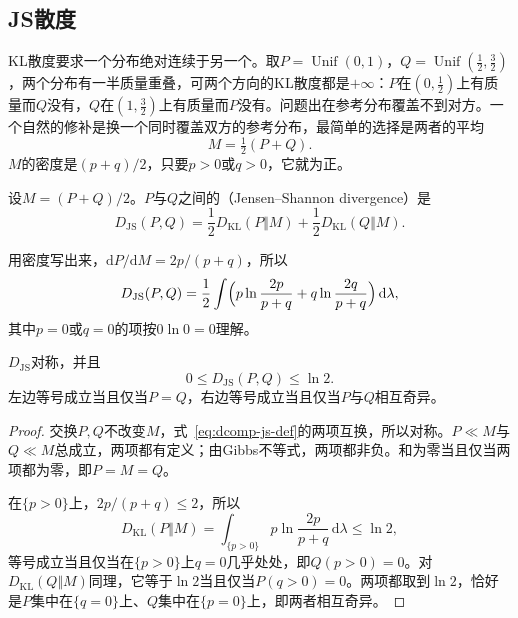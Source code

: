\subsection{JS散度}
\label{sec:dcomp-js}

KL散度要求一个分布绝对连续于另一个。取$P=\operatorname{Unif}(0,1)$，$Q=\operatorname{Unif}(\tfrac12,\tfrac32)$，两个分布有一半质量重叠，可两个方向的KL散度都是$+\infty$：$P$在$(0,\tfrac12)$上有质量而$Q$没有，$Q$在$(1,\tfrac32)$上有质量而$P$没有。问题出在参考分布覆盖不到对方。一个自然的修补是换一个同时覆盖双方的参考分布，最简单的选择是两者的平均
\[
 M=\tfrac12(P+Q) .
\]
$M$的密度是$(p+q)/2$，只要$p>0$或$q>0$，它就为正。

\begin{definition}[JS散度]
\label{def:dcomp-js}
设$M=(P+Q)/2$。$P$与$Q$之间的（Jensen--Shannon divergence）是
\begin{equation}
 D_{\mathrm{JS}}(P,Q)=\frac12D_{\mathrm{KL}}(P\Vert M)+\frac12D_{\mathrm{KL}}(Q\Vert M) .
 \label{eq:dcomp-js-def}
\end{equation}
\end{definition}

用密度写出来，$\mathrm{d}P/\mathrm{d}M=2p/(p+q)$，所以
\[
 D_{\mathrm{JS}}(P,Q)=\frac12\int\Bigl(p\ln\frac{2p}{p+q}+q\ln\frac{2q}{p+q}\Bigr)\,\mathrm{d}\lambda ,
\]
其中$p=0$或$q=0$的项按$0\ln0=0$理解。

\begin{theorem}[JS散度的范围]
\label{thm:dcomp-js-range}
$D_{\mathrm{JS}}$对称，并且
\begin{equation}
 0\leq D_{\mathrm{JS}}(P,Q)\leq\ln2 .
 \label{eq:dcomp-js-range}
\end{equation}
左边等号成立当且仅当$P=Q$，右边等号成立当且仅当$P$与$Q$相互奇异。
\end{theorem}

\begin{proof}
交换$P,Q$不改变$M$，式~\eqref{eq:dcomp-js-def}的两项互换，所以对称。$P\ll M$与$Q\ll M$总成立，两项都有定义；由Gibbs不等式，两项都非负。和为零当且仅当两项都为零，即$P=M=Q$。

在$\{p>0\}$上，$2p/(p+q)\leq2$，所以
\[
 D_{\mathrm{KL}}(P\Vert M)=\int_{\{p>0\}}p\ln\frac{2p}{p+q}\,\mathrm{d}\lambda\leq\ln2,
\]
等号成立当且仅当在$\{p>0\}$上$q=0$几乎处处，即$Q(p>0)=0$。对$D_{\mathrm{KL}}(Q\Vert M)$同理，它等于$\ln2$当且仅当$P(q>0)=0$。两项都取到$\ln2$，恰好是$P$集中在$\{q=0\}$上、$Q$集中在$\{p=0\}$上，即两者相互奇异。
\end{proof}

